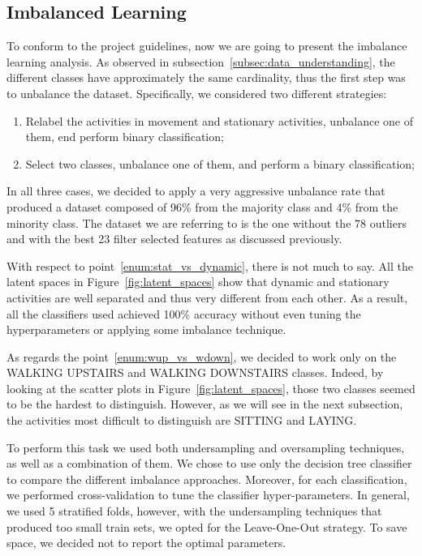 \documentclass[10pt, a4paper, twocolumn]{article}
\begin{document}
\subsection{Imbalanced Learning}\label{sec:imbalancedlearning}

To conform to the project guidelines, now we are going to present the imbalance learning analysis. As observed in subsection~\ref{subsec:data_understanding}, the different classes have approximately the same cardinality, thus the first step was to unbalance the dataset. Specifically, we considered two different strategies:
%
\begin{enumerate}
\item Relabel the activities in movement and stationary activities, unbalance one of them, end perform binary classification;\label{enum:stat_vs_dynamic}
\item Select two classes, unbalance one of them, and perform a binary classification;\label{enum:wup_vs_wdown}
\end{enumerate}
%
In all three cases, we decided to apply a very aggressive unbalance rate that produced a dataset composed of 96\% from the majority class and 4\% from the minority class. The dataset we are referring to is the one without the 78 outliers and with the best 23 filter selected features as discussed previously.

With respect to point~\ref{enum:stat_vs_dynamic}, there is not much to say. All the latent spaces in Figure~\ref{fig:latent_spaces} show that dynamic and stationary activities are well separated and thus very different from each other. As a result, all the classifiers used achieved 100\% accuracy without even tuning the hyperparameters or applying some imbalance technique.

As regards the point~\ref{enum:wup_vs_wdown}, we decided to work only on the WALKING UPSTAIRS and WALKING DOWNSTAIRS classes. Indeed, by looking at the scatter plots in Figure~\ref{fig:latent_spaces}, those two classes seemed to be the hardest to distinguish. However, as we will see in the next subsection, the activities most difficult to distinguish are SITTING and LAYING.

To perform this task we used both undersampling and oversampling techniques, as well as a combination of them. We chose to use only the decision tree classifier to compare the different imbalance approaches. Moreover, for each classification, we performed cross-validation to tune the classifier hyper-parameters. In general, we used 5 stratified folds, however, with the undersampling techniques that produced too small train sets, we opted for the Leave-One-Out strategy. To save space, we decided not to report the optimal parameters.
\end{document}
